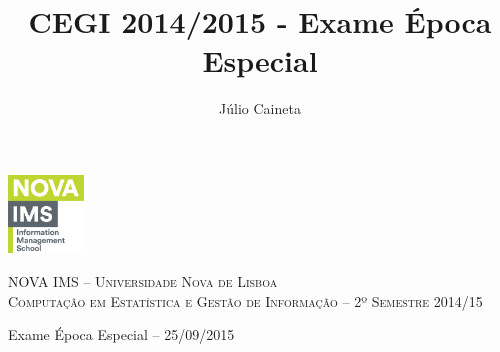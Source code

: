 \documentclass[addpoints]{exam}
\author{Júlio Caineta}
\title{CEGI 2014/2015 - Exame Época Especial}
\begin{document}
	
\noindent\begin{minipage}{0.2\textwidth}%
	\includegraphics[width=2cm]{logo.png}
\end{minipage}
\hfill
\begin{minipage}{0.8\textwidth}
	\begin{center}
		\textsc {\small NOVA IMS -- Universidade Nova de Lisboa} \\
		\textsc {Computação em Estatística e Gestão de Informação -- 2º Semestre 2014/15}
	\end{center}
\end{minipage}

\begin{center}
	{\large Exame Época Especial -- 25/09/2015}
\end{center}
 
\vspace{5mm}
\vspace{5mm}
\end{document}
